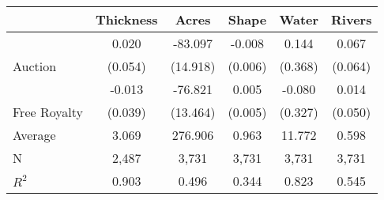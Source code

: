 
\begin{tabular}{lccccc}
\toprule
 & Thickness & Acres & Shape & Water & Rivers\\
\midrule
 & 0.020 & -83.097 & -0.008 & 0.144 & 0.067\\

\multirow{-2}{*}{\raggedright\arraybackslash Auction} & (0.054) & (14.918) & (0.006) & (0.368) & (0.064)\\

 & -0.013 & -76.821 & 0.005 & -0.080 & 0.014\\

\multirow{-2}{*}{\raggedright\arraybackslash Free Royalty} & (0.039) & (13.464) & (0.005) & (0.327) & (0.050)\\

\midrule
Average & 3.069 & 276.906 & 0.963 & 11.772 & 0.598\\

N & 2,487 & 3,731 & 3,731 & 3,731 & 3,731\\

$R^2$ & 0.903 & 0.496 & 0.344 & 0.823 & 0.545\\
\bottomrule
\end{tabular}
